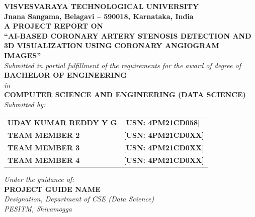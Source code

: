 \begin{titlepage}
\begin{center}

{\large \textbf{VISVESVARAYA TECHNOLOGICAL UNIVERSITY}}\\
{\normalsize \textbf{Jnana Sangama, Belagavi -- 590018, Karnataka, India}}\\[1.0cm]

\vspace{0.3cm}
\textbf{\large A PROJECT REPORT ON}\\[0.5cm]

\textbf{\Large ``AI-BASED CORONARY ARTERY STENOSIS DETECTION AND 3D VISUALIZATION USING CORONARY ANGIOGRAM IMAGES''}\\[0.8cm]

\textit{Submitted in partial fulfillment of the requirements for the award of degree of}\\[0.3cm]
\textbf{\large BACHELOR OF ENGINEERING}\\[0.2cm]
\textit{in}\\[0.2cm]
\textbf{\large COMPUTER SCIENCE AND ENGINEERING (DATA SCIENCE)}\\[0.8cm]

\textit{Submitted by:}\\[0.3cm]
\begin{table}[h!]
\centering
\begin{tabular}{ll}
\textbf{UDAY KUMAR REDDY Y G} & \textbf{[USN: 4PM21CD058]} \\
\textbf{TEAM MEMBER 2} & \textbf{[USN: 4PM21CD0XX]} \\
\textbf{TEAM MEMBER 3} & \textbf{[USN: 4PM21CD0XX]} \\
\textbf{TEAM MEMBER 4} & \textbf{[USN: 4PM21CD0XX]} \\
\end{tabular}
\end{table}

\vspace{0.5cm}
\textit{Under the guidance of:}\\[0.3cm]
\textbf{PROJECT GUIDE NAME}\\[0.1cm]
\textit{Designation, Department of CSE (Data Science)}\\[0.1cm]
\textit{PESITM, Shivamogga}\\[0.8cm]

\begin{figure}[H]
\centering
\end{figure}


\end{center}
\end{titlepage}
